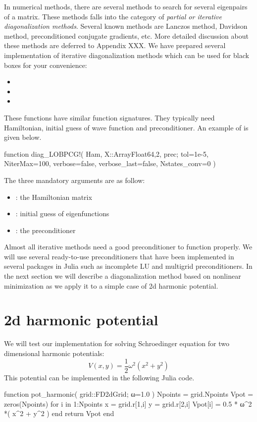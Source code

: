In numerical methods, there are several methods to search for several eigenpairs
of a matrix. These methods falls into the category of \textit{partial or iterative
diagonalization methods}. Several known methods are Lanczos method, Davidson method,
preconditioned conjugate gradients, etc.
More detailed discussion about these methods are deferred to Appendix XXX.
We have prepared several implementation of iterative diagonalization methods
which can be used for black boxes for your convenience:
%
\begin{itemize}
\item {}
\item {}
\item {}
\end{itemize}
%
These functions have similar function signatures. They typically
need Hamiltonian, initial guess of wave function and preconditioner.
An example of  is given below.
%
\begin{juliacode}
function diag_LOBPCG!( Ham, X::Array{Float64,2}, prec;
                       tol=1e-5, NiterMax=100, verbose=false,
                       verbose_last=false, Nstates_conv=0 )
\end{juliacode}
%
The three mandatory arguments are as follow:
%
\begin{itemize}
\item {}: the Hamiltonian matrix
\item {}: initial guess of eigenfunctions
\item {}: the preconditioner
\end{itemize}

Almost all iterative methods need a good preconditioner to function properly.
We will use several ready-to-use preconditioners that have been implemented
in several packages in Julia such as incomplete LU and multigrid preconditioners.
In the next section we will describe a diagonalization method based
on nonlinear minimization as we apply it to a simple case of 2d harmonic
potential.


\section{2d harmonic potential}

We will test our implementation for solving Schroedinger equation for two
dimensional harmonic potentials:
%
\begin{equation}
V(x,y) = \frac{1}{2} \omega^2 (x^2 + y^2)
\end{equation}
%
This potential can be implemented in the following Julia code.
%
\begin{juliacode}
function pot_harmonic( grid::FD2dGrid; ω=1.0 )
  Npoints = grid.Npoints
  Vpot = zeros(Npoints)
  for i in 1:Npoints
    x = grid.r[1,i]
    y = grid.r[2,i]
    Vpot[i] = 0.5 * ω^2 *( x^2 + y^2 )
  end
  return Vpot
end
\end{juliacode}

